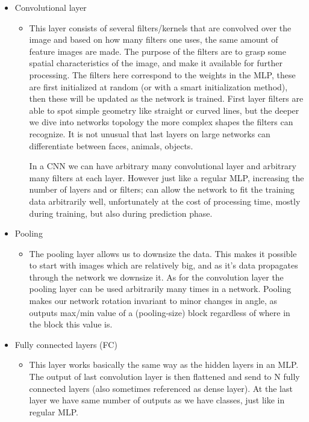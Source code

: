 \documentclass[Report.tex]{subfiles}
\begin{document}
\begin{flushleft}
  \begin{itemize}
    \item{Convolutional layer}
    \begin{itemize}
      \item{This layer consists of several filters/kernels that are convolved over the image and based on how many filters one uses, the same amount of feature images are made. The purpose of the filters are to grasp some spatial characteristics of the image, and make it available for further processing.
      The filters here correspond to the weights in the MLP, these are first initialized at random (or with a smart initialization method), then these will be updated as the network is trained.
      First layer filters are able to spot simple geometry like straight or curved lines, but the deeper we dive into networks topology the more complex shapes the filters can recognize. It is not unusual that last layers on large networks can differentiate between faces, animals, objects.\par
      In a CNN we can have arbitrary many convolutional layer and arbitrary many filters at each layer. However just like a regular MLP, increasing the number of layers and or filters; can allow the network to fit the training data arbitrarily well, unfortunately at the cost of processing time, mostly during training, but also during prediction phase.}
    \end{itemize}
    \item{Pooling}
    \begin{itemize}
      \item{The pooling layer allows us to downsize the data. This makes it possible to start with images which are relatively big, and as it's data propagates through the network we downsize it. As for the convolution layer the pooling layer can be used arbitrarily many times in a network.
      Pooling makes our network rotation invariant to minor changes in angle, as outputs max/min value of a (pooling-size) block regardless of where in the block this value is.}
    \end{itemize}
    \item{Fully connected layers (FC)}
    \begin{itemize}
      \item{This layer works basically the same way as the hidden layers in an MLP.
      The output of last convolution layer is then flattened and send to N fully connected layers (also sometimes referenced as dense layer). At the last layer we have same number of outputs as we have classes, just like in regular MLP.}
    \end{itemize}
  \end{itemize}
\end{flushleft}
\end{document}
